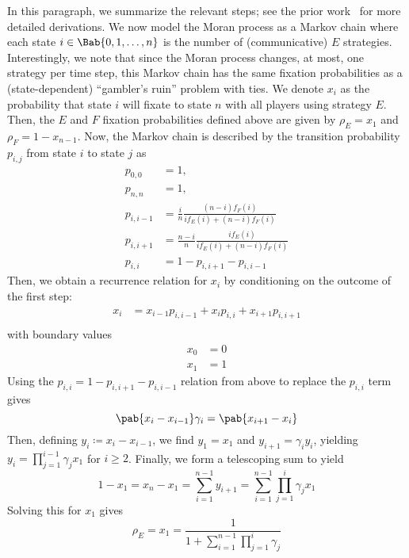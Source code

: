 \documentclass[pdflatex,sn-nature,super]{sn-jnl}
\begin{document}
In this paragraph, we summarize the relevant steps;
see the prior work~\citep{tripp2022evolutionary}
for more detailed derivations.
We now model the Moran process
as a Markov chain where each state $i \in \Bab{0,1,\ldots,n}$
is the number of (communicative) $E$ strategies.
Interestingly, we note that since the Moran process changes, at most,
one strategy per time step,
this Markov chain has the same fixation probabilities
as a (state-dependent) ``gambler's ruin'' problem with ties.
We denote $x_i$ as the probability that state $i$ will fixate
to state $n$ with all players using strategy $E$.
Then, the $E$ and $F$ fixation probabilities defined above are given by
$\rho_E = x_1$ and $\rho_F = 1 - x_{n-1}$.
Now, the Markov chain is described by the transition probability $p_{i,j}$
from state $i$ to state $j$ as
\begin{align*}
  p_{0,0} &= 1, \\
  p_{n,n} &= 1, \\
  p_{i,i-1} &= \frac{i}{n} \frac{(n-i) f_F(i)}{i f_E(i) + (n-i) f_F(i)} \\
  p_{i,i+1} &= \frac{n-i}{n} \frac{i f_E(i)}{i f_E(i) + (n-i) f_F(i)} \\
  p_{i,i} &= 1 - p_{i,i+1} - p_{i,i-1}
\end{align*}
Then, we obtain a recurrence relation for $x_i$ by conditioning
on the outcome of the first step:
\begin{align*}
  x_i &= x_{i-1} p_{i,i-1} + x_i p_{i,i} + x_{i+1} p_{i,i+1} \\
\end{align*}
with boundary values
\begin{align*}
  x_0 &= 0 \\
  x_1 &= 1
\end{align*}
Using the $p_{i,i} = 1 - p_{i,i+1} - p_{i,i-1}$ relation from above
to replace the $p_{i,i}$ term gives
\begin{equation*}
  \pab{x_i - x_{i-1}} \gamma_i = \pab{x_{i+1} - x_i}
\end{equation*}
Then, defining $y_i \coloneqq x_i - x_{i-1}$,
we find $y_1 = x_1$ and $y_{i+1} = \gamma_i y_i$,
yielding $y_i = \prod_{j=1}^{i-1} \gamma_j x_1$ for $i \ge 2$.
Finally, we form a telescoping sum to yield
\begin{equation*}
  1 - x_1 = x_n - x_1
  = \sum_{i=1}^{n-1} y_{i+1}
  = \sum_{i=1}^{n-1} \prod_{j=1}^i \gamma_j x_1
\end{equation*}
Solving this for $x_1$ gives
\begin{equation}
  \rho_E = x_1 = \frac{1}{1 + \sum_{i=1}^{n-1} \prod_{j=1}^i \gamma_j}
  \label{eq:comm_fixation_prob}
\end{equation}
\end{document}
